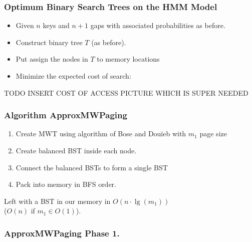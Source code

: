 \documentclass[]{beamer}
\theoremstyle{plain}
\begin{document}
\begin{frame} \frametitle{Optimum Binary Search Trees on the HMM Model}
\begin{itemize}
\item Given $n$ keys and $n+1$ gaps with associated probabilities as before.  
\item Construct binary tree $T$ (as before).
\item Put assign the nodes in $T$ to memory locations
\item Minimize the expected cost of search:
\end{itemize}
\end{frame}

\begin{frame}
TODO INSERT COST OF ACCESS PICTURE WHICH IS SUPER NEEDED


\end{frame}

\begin{frame}[fragile] \frametitle{Algorithm ApproxMWPaging}\label{Algorithm ApproxMWPaging}

\begin{enumerate}
\item Create MWT using algorithm of Bose and Dou\"{i}eb with $m_1$ page size

\item Create balanced BST inside each node.

\item Connect the balanced BSTs to form a single BST

\item Pack into memory in BFS order.

\end{enumerate}

\noindent Left with a BST in our memory in $O(n\cdot\lg(m_1))$  \\
($O(n)$ if $m_1 \in O(1)$).

\end{frame}

\begin{frame} \frametitle{ApproxMWPaging Phase 1.}

\begin{tiny}
\begin{center}


\end{center}
\end{tiny}

\end{frame}
\end{document}
